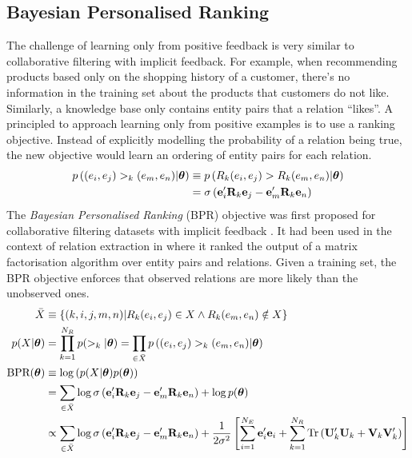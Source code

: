 \documentclass[a4paper, 11pt, fleqn]{article}
\newcommand{\btheta}[0]{\boldsymbol{\theta}}
\begin{document}
\subsection{Bayesian Personalised Ranking}

The challenge of learning only from positive feedback is very similar
to collaborative filtering with implicit feedback. For example, when
recommending products based only on the shopping history of a
customer, there's no information in the training set about the
products that customers do not like. Similarly, a knowledge base only
contains entity pairs that a relation ``likes''. A principled to
approach learning only from positive examples is to use a ranking
objective. Instead of explicitly modelling the probability of a
relation being true, the new objective would learn an ordering of
entity pairs for each relation.
\begin{align}
  p\left( (e_i, e_j) >_{k} (e_m, e_n) \vert \btheta\right) &\equiv
  p\left( R_k(e_i, e_j) > R_k(e_m, e_n) \vert \btheta\right) \nonumber \\
  &= \sigma\left( {\bf e}'_i{\bf R}_k{\bf e}_j -
    {\bf e}'_m{\bf R}_k{\bf e}_n\right )
\end{align}
\noindent The \emph{Bayesian Personalised Ranking} (BPR) objective was first
proposed for collaborative filtering datasets with implicit feedback
\cite{rendle2009bpr}. It had been used in the context of relation
extraction in \cite{riedel13relation} where it ranked the output of a
matrix factorisation algorithm over entity pairs and relations.
\noindent Given a training set, the BPR objective enforces that
observed relations are more likely than the unobserved ones.
\begin{align}
  \bar{X} &\equiv \left\{(k,i,j,m,n)\vert R_k(e_i, e_j) \in X \wedge R_k(e_m, e_n) \notin X \right\} \\
  p(X\vert\btheta) &= \prod_{k=1}^{N_R}p(>_k\vert \btheta) =
  \prod_{\in\bar{X}} p\left( (e_i, e_j) >_{k} (e_m,
    e_n)\vert \btheta \right) \\
  \text{BPR}(\btheta) &\equiv \log \left( p(X\vert\btheta) p(\btheta)
  \right)
  \nonumber \\
  &= \sum_{\in\bar{X}} \log \sigma\left( {\bf e}'_i{\bf R}_k{\bf e}_j
    - {\bf e}'_m{\bf R}_k{\bf e}_n\right ) + \log p(\btheta) \nonumber
  \\
  \label{eqn:bpr_obj}
  &\propto \sum_{\in\bar{X}} \log \sigma\left( {\bf e}'_i{\bf R}_k{\bf
      e}_j - {\bf e}'_m{\bf R}_k{\bf e}_n\right ) +
  \frac{1}{2\sigma^2}\left[ \sum_{i=1}^{N_E} {\bf e}_i'{\bf e}_i
    +\sum_{k=1}^{N_R} \text{Tr}\left({\bf U}_k'{\bf U}_k + {\bf
        V}_k{\bf V}_k'\right)\right]
\end{align}
\end{document}
